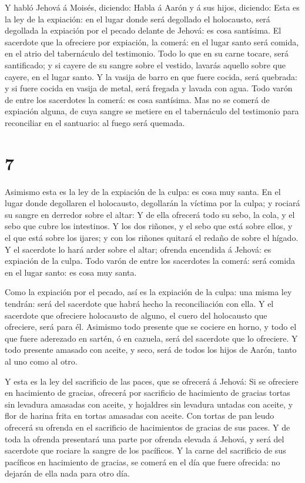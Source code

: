  Y habló Jehová á Moisés, diciendo:  Habla á
Aarón y á sus hijos, diciendo: Esta es la ley de la expiación: en el
lugar donde será degollado el holocausto, será degollada la expiación
por el pecado delante de Jehová: es cosa santísima.  El
sacerdote que la ofreciere por expiación, la comerá: en el lugar santo
será comida, en el atrio del tabernáculo del testimonio. 
Todo lo que en su carne tocare, será santificado; y si cayere de su
sangre sobre el vestido, lavarás aquello sobre que cayere, en el lugar
santo.  Y la vasija de barro en que fuere cocida, será
quebrada: y si fuere cocida en vasija de metal, será fregada y lavada
con agua.  Todo varón de entre los sacerdotes la comerá: es
cosa santísima.  Mas no se comerá de expiación alguna, de
cuya sangre se metiere en el tabernáculo del testimonio para reconciliar
en el santuario: al fuego será quemada.

\hypertarget{section-6}{%
\section{7}\label{section-6}}

 Asimismo esta es la ley de la expiación de la culpa: es
cosa muy santa.  En el lugar donde degollaren el holocausto,
degollarán la víctima por la culpa; y rociará su sangre en derredor
sobre el altar:  Y de ella ofrecerá todo su sebo, la cola, y
el sebo que cubre los intestinos.  Y los dos riñones, y el
sebo que está sobre ellos, y el que está sobre los ijares; y con los
riñones quitará el redaño de sobre el hígado.  Y el
sacerdote lo hará arder sobre el altar; ofrenda encendida á Jehová: es
expiación de la culpa.  Todo varón de entre los sacerdotes
la comerá: será comida en el lugar santo: es cosa muy santa.

 Como la expiación por el pecado, así es la expiación de la
culpa: una misma ley tendrán: será del sacerdote que habrá hecho la
reconciliación con ella.  Y el sacerdote que ofreciere
holocausto de alguno, el cuero del holocausto que ofreciere, será para
él.  Asimismo todo presente que se cociere en horno, y todo
el que fuere aderezado en sartén, ó en cazuela, será del sacerdote que
lo ofreciere.  Y todo presente amasado con aceite, y seco,
será de todos los hijos de Aarón, tanto al uno como al otro.

 Y esta es la ley del sacrificio de las paces, que se
ofrecerá á Jehová:  Si se ofreciere en hacimiento de
gracias, ofrecerá por sacrificio de hacimiento de gracias tortas sin
levadura amasadas con aceite, y hojaldres sin levadura untadas con
aceite, y flor de harina frita en tortas amasadas con aceite.
 Con tortas de pan leudo ofrecerá su ofrenda en el
sacrificio de hacimientos de gracias de sus paces.  Y de
toda la ofrenda presentará una parte por ofrenda elevada á Jehová, y
será del sacerdote que rociare la sangre de los pacíficos. 
Y la carne del sacrificio de sus pacíficos en hacimiento de gracias, se
comerá en el día que fuere ofrecida: no dejarán de ella nada para otro
día.

